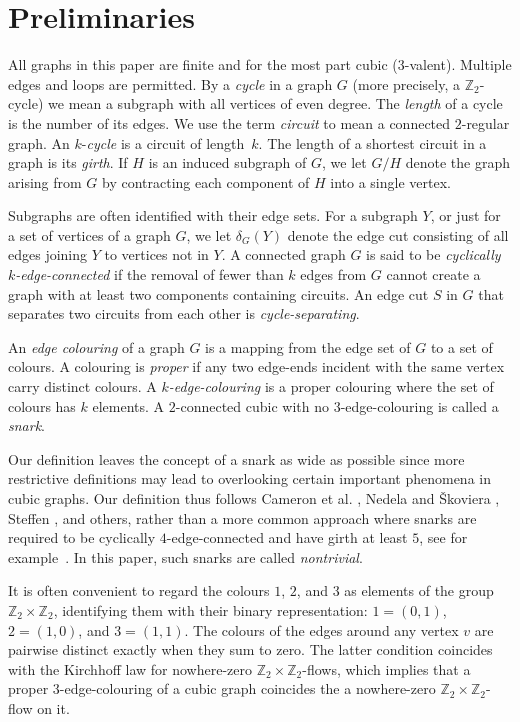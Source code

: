 \documentclass[a4paper]{amsart}
\theoremstyle{plain}
\theoremstyle{definition}
\begin{document}
\section{Preliminaries}\label{sec:prelim}

\noindent{}All graphs in this paper are finite and for the most
part cubic (3-valent). Multiple edges and loops are permitted.
By a \emph{cycle} in a graph $G$ (more precisely, a
$\mathbb{Z}_2$-cycle) we mean a subgraph with all vertices of
even degree. The \textit{length} of a cycle is the number of
its edges. We use the term \emph{circuit} to mean a connected
$2$-regular graph. An $k$-\emph{cycle} is a circuit of
length~$k$. The length of a shortest circuit in a graph is its
\emph{girth}. If $H$ is an induced subgraph of $G$, we let
$G/H$ denote the graph arising from $G$ by contracting each
component of $H$ into a single vertex.

Subgraphs are often identified with their edge sets. For a
subgraph $Y$, or just for a set of vertices of a graph $G$, we
let $\delta_G(Y)$ denote the edge cut consisting of all edges
joining $Y$ to vertices not in $Y$. A connected graph $G$ is
said to be \emph{cyclically $k$-edge-connected} if the removal
of fewer than $k$ edges from $G$ cannot create a graph with at
least two components containing circuits. An edge cut $S$ in
$G$ that separates two circuits from each other is
\emph{cycle-separating}.

An \emph{edge colouring} of a graph $G$ is a mapping from the
edge set of $G$ to a set of colours. A colouring is
\emph{proper} if any two edge-ends incident with the same
vertex carry distinct colours. A \emph{$k$-edge-colouring} is a
proper colouring where the set of colours has $k$ elements. 
A $2$-connected cubic with no $3$-edge-colouring is called a \emph{snark}.

Our definition leaves the concept of a snark as wide as
possible since more restrictive definitions may lead to
overlooking certain important phenomena in cubic graphs. Our
definition thus follows Cameron et al. \cite{CCW}, Nedela and
\v Skoviera \cite{NS-decred}, Steffen \cite{S1}, and others,
rather than a more common approach where snarks are required to
be cyclically $4$-edge-connected and have girth at least $5$,
see for example~\cite{FMS-survey}. In this paper, such snarks
are called \emph{nontrivial}.

It is often convenient to regard the colours $1$,
$2$, and $3$ as elements of the group
$\mathbb{Z}_2\times\mathbb{Z}_2$, identifying them with their binary representation: $1=(0,1)$,
$2=(1,0)$, and $3=(1,1)$. The colours of the edges
around any vertex $v$ are pairwise distinct exactly when they sum to zero. The latter condition coincides with the Kirchhoff
law for nowhere-zero $\mathbb{Z}_2\times\mathbb{Z}_2$-flows, which implies that a proper $3$-edge-colouring of a cubic graph coincides the a nowhere-zero
$\mathbb{Z}_2\times\mathbb{Z}_2$-flow on it.
\end{document}
